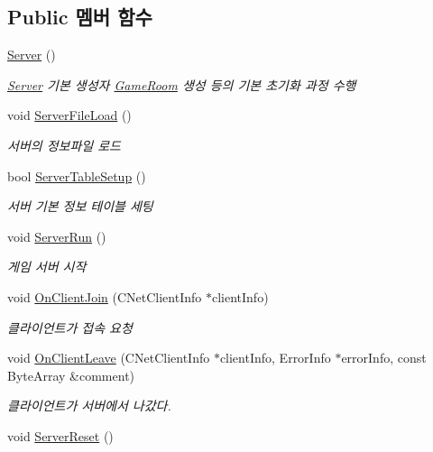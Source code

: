 \subsection*{Public 멤버 함수}
\begin{DoxyCompactItemize}
\item 
\hyperlink{class_server_ad5ec9462b520e59f7ea831e157ee5e59}{Server} ()
\begin{DoxyCompactList}\small\item\em \hyperlink{class_server}{Server} 기본 생성자  \hyperlink{class_game_room}{Game\+Room} 생성 등의 기본 초기화 과정 수행 \end{DoxyCompactList}\item 
void \hyperlink{class_server_abfc09109c7050e40d8fc1e3daea76edf}{Server\+File\+Load} ()
\begin{DoxyCompactList}\small\item\em 서버의 정보파일 로드 \end{DoxyCompactList}\item 
bool \hyperlink{class_server_a2ea82221dd5edd72b97a465a9753a68e}{Server\+Table\+Setup} ()
\begin{DoxyCompactList}\small\item\em 서버 기본 정보 테이블 세팅 \end{DoxyCompactList}\item 
void \hyperlink{class_server_acb327f7980ef16c40087bdafcef5ad7a}{Server\+Run} ()
\begin{DoxyCompactList}\small\item\em 게임 서버 시작 \end{DoxyCompactList}\item 
void \hyperlink{class_server_af0a8684eda8d55b06a48a100320a2f3c}{On\+Client\+Join} (C\+Net\+Client\+Info $\ast$client\+Info)
\begin{DoxyCompactList}\small\item\em 클라이언트가 접속 요청 \end{DoxyCompactList}\item 
void \hyperlink{class_server_a1249766dc00efcf1f29a2aaad56f83ef}{On\+Client\+Leave} (C\+Net\+Client\+Info $\ast$client\+Info, Error\+Info $\ast$error\+Info, const Byte\+Array \&comment)
\begin{DoxyCompactList}\small\item\em 클라이언트가 서버에서 나갔다. \end{DoxyCompactList}\item 
void \hyperlink{class_server_a88d53d3c77d90f211f3ca7cc51735171}{Server\+Reset} ()

\end{DoxyCompactItemize}
